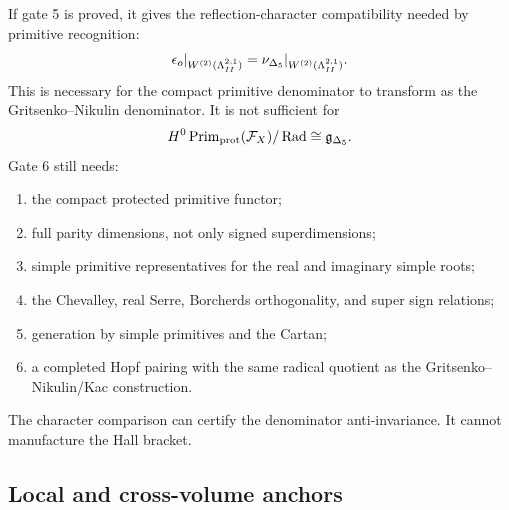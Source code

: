 If gate 5 is proved, it gives the reflection-character compatibility
needed by primitive recognition:
\[
        \epsilon_o|_{W^{(2)}(\Lambda^{2,1}_{II})}=\nu_{\Delta_5}|_{W^{(2)}(\Lambda^{2,1}_{II})}.
\]
This is necessary for the compact primitive denominator to transform as
the Gritsenko--Nikulin denominator.  It is not sufficient for
\[
        H^0\operatorname{Prim}_{\mathrm{prot}}(\mathcal F_X)/\operatorname{Rad}
        \cong \mathfrak g_{\Delta_5} .
\]
Gate 6 still needs:
\begin{enumerate}
\item the compact protected primitive functor;
\item full parity dimensions, not only signed superdimensions;
\item simple primitive representatives for the real and imaginary simple
roots;
\item the Chevalley, real Serre, Borcherds orthogonality, and super sign
relations;
\item generation by simple primitives and the Cartan;
\item a completed Hopf pairing with the same radical quotient as the
Gritsenko--Nikulin/Kac construction.
\end{enumerate}
The character comparison can certify the denominator anti-invariance.
It cannot manufacture the Hall bracket.

\subsection{Local and cross-volume anchors}

